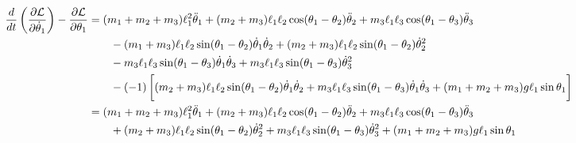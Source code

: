 \documentclass[letterpaper,8pt]{article}
\begin{document}
\begin{align*}
\frac{d}{dt} \left( \frac{\partial \mathcal{L}}{\partial \dot{\theta}_1} \right) - \frac{\partial \mathcal{L}}{\partial \theta_1} 
  &=  (m_1 + m_2 + m_3)\ell_1^2 \ddot{\theta}_1 
           + (m_2 + m_3)\ell_1\ell_2 \cos(\theta_1 - \theta_2)\ddot{\theta}_2 
           + m_3 \ell_1 \ell_3 \cos (\theta_1 - \theta_3)\ddot{\theta}_3 \\
  & \qquad - (m_1 + m_3)\ell_1\ell_2 \sin(\theta_1 - \theta_2)\dot{\theta}_1\dot{\theta}_2  
           + (m_2 + m_3)\ell_1\ell_2 \sin(\theta_1 - \theta_2)\dot{\theta}_2^2 \\
  & \qquad - m_3 \ell_1 \ell_3 \sin (\theta_1 - \theta_3)\dot{\theta}_1\dot{\theta}_3  
           + m_3 \ell_1 \ell_3 \sin (\theta_1 - \theta_3)\dot{\theta}_3^2 \\
  & \qquad - (-1) \left[ \vphantom{\frac{1}{2}} (m_2 + m_3)\ell_1 \ell_2 \sin (\theta_1 - \theta_2) \dot{\theta}_1 \dot{\theta}_2
           + m_3 \ell_1 \ell_3 \sin (\theta_1 - \theta_3) \dot{\theta}_1\dot{\theta}_3
           + (m_1 + m_2 + m_3) g \ell_1 \sin \theta_1 \right] \\
  &=  (m_1 + m_2 + m_3)\ell_1^2 \ddot{\theta}_1
           + (m_2 + m_3)\ell_1\ell_2 \cos(\theta_1 - \theta_2)\ddot{\theta}_2
           + m_3 \ell_1 \ell_3 \cos (\theta_1 - \theta_3)\ddot{\theta}_3 \\
  & \qquad + (m_2 + m_3)\ell_1\ell_2 \sin(\theta_1 - \theta_2)\dot{\theta}_2^2 
           + m_3 \ell_1 \ell_3 \sin (\theta_1 - \theta_3)\dot{\theta}_3^2 
           + (m_1 + m_2 + m_3) g \ell_1 \sin \theta_1 \\
\end{align*}
\end{document}
